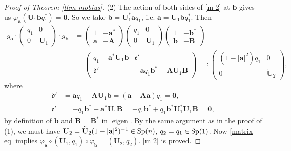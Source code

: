 \documentclass[a4paper,11pt]{amsart}
\numberwithin{equation}{section}
\begin{document}
\begin{proof}[Proof of Theorem \ref{thm mobius}]
(2)\; The action of both sides of \eqref{m 2} at $\mathbf{b}$ gives us $\varphi_{\mathbf{a}}(\mathbf{U}_1\mathbf{b}q_1^{*})=\mathbf{0}$. So we take
$\mathbf{b}=\mathbf{U}_1^{*}\mathbf{a}q_1$, i.e. $\mathbf{a}=\mathbf{U}_1\mathbf{b}q_1^{*}$. Then
\begin{equation}\begin{aligned}\label{matrix eq}
g_{\mathbf{a}}\cdot \begin{pmatrix} q_1 & 0\\ 0 & \mathbf{U}_1 \end{pmatrix}\cdot g_{\mathbf{b}} &=\begin{pmatrix} 1 & -\mathbf{a}^* \\ \mathbf{a} & -\mathbf{A} \end{pmatrix}
  \begin{pmatrix} q_1 & 0 \\ 0 & \mathbf{U}_1 \end{pmatrix}
 \begin{pmatrix} 1 & -\mathbf{b}^* \\ \mathbf{b} & -\mathbf{B} \end{pmatrix}\\
 &=\begin{pmatrix}q_ 1 -\mathbf{a}^*\mathbf{U}_1\mathbf{b}&\mathfrak{e}' \\ \mathfrak{d}' &-\mathbf{a}q_1\mathbf{b}^* +\mathbf{A}\mathbf{U}_1\mathbf{B} \end{pmatrix}=: \begin{pmatrix} (1-|\mathbf{a}|^2)q_1 & 0 \\ 0 & \widetilde{\mathbf{U}}_2 \end{pmatrix},
\end{aligned}\end{equation}
where
\begin{equation*}\begin{aligned}
\mathfrak{d}'&=\mathbf{a}q_1-\mathbf{A}\mathbf{U}_1\mathbf{b}=(\mathbf{a}-\mathbf{A}\mathbf{a})q_1=\mathbf{0},\\
\mathfrak{e}'&=-q_1\mathbf{b}^*+\mathbf{a}^*\mathbf{U}_1\mathbf{B}=-q_1\mathbf{b}^*+q_1\mathbf{b}^*\mathbf{U}_1^*\mathbf{U}_1\mathbf{B}=\mathbf{0},
\end{aligned}\end{equation*}
by definition of $\mathbf{b}$ and $\mathbf{B}=\mathbf{B}^{*}$ in \eqref{eigen}. By the same argument as in the proof of (1), we must have $\mathbf{U}_2=\widetilde{\mathbf{U}}_2(1-|\mathbf{a}|^2)^{-1}\in {\rm Sp}(n)$, $q_2=q_1\in {\rm Sp}(1)$. Now \eqref{matrix eq} implies $\varphi_{\mathbf{a}}\circ (\mathbf{U}_1,q_1)\circ\varphi_{\mathbf{b}}=(\mathbf{U}_2,q_2)$. \eqref{m 2} is proved.



\end{proof}
\end{document}
